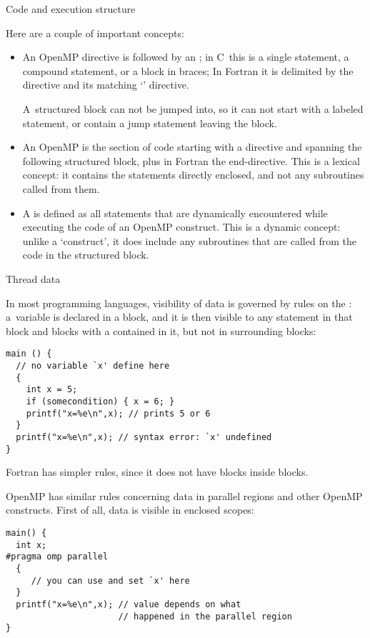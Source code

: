  {Code and execution structure}
\label{sec:omp-code-structure}

Here are a couple of important concepts:
\begin{itemize}
\item An OpenMP directive is followed by an
  ; in C~this is a single statement, a
  compound statement, or a block in braces; In Fortran it is
  delimited by the directive and its matching `' directive.

  A~structured block can not be jumped into, so it can not start with a
  labeled statement, or contain a jump statement leaving the block.
\item 
 An OpenMP  is the section of code
  starting with a directive and spanning the following structured block,
  plus in Fortran the end-directive. This is a lexical concept: it contains
  the statements directly enclosed, and not any subroutines called from them.
\item
  A  is defined as all statements
  that are dynamically encountered while executing the code of an OpenMP construct.
  This is a dynamic concept: unlike a `construct', it does include any subroutines
  that are called from the code in the structured block.
\end{itemize}

 {Thread data}

In most programming languages, visibility of data
is governed by rules on the :
a~variable is declared in a block, and it is then visible to any
statement in that block and blocks with a 
contained in it, but not in surrounding blocks:
\begin{lstlisting}
main () {
  // no variable `x' define here
  {
    int x = 5;
    if (somecondition) { x = 6; }
    printf("x=%e\n",x); // prints 5 or 6
  }
  printf("x=%e\n",x); // syntax error: `x' undefined
}
\end{lstlisting}
Fortran has simpler rules, since it does not have blocks inside blocks.

OpenMP has similar rules concerning data in parallel regions
and other OpenMP constructs. First of all, data is visible
in enclosed scopes:
\begin{lstlisting}
main() {
  int x;
#pragma omp parallel
  {
     // you can use and set `x' here
  }
  printf("x=%e\n",x); // value depends on what
                      // happened in the parallel region
}
\end{lstlisting}

